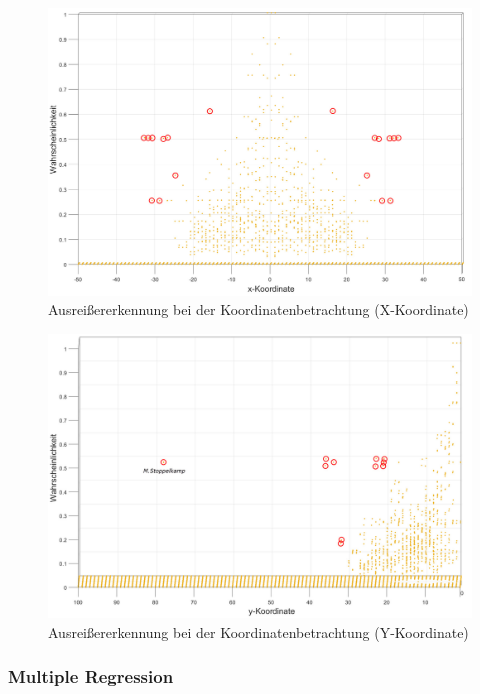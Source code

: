\begin{figure}[H]
\centering
\includegraphics[scale=0.31]{se-wa-jpg/outlierKY}
\caption{Ausreißererkennung bei der Koordinatenbetrachtung (X-Koordinate)}
\label{outlierKX}
\end{figure}

\begin{figure}[H]
\centering
\includegraphics[scale=0.31]{se-wa-jpg/outlierKX}
\caption{Ausreißererkennung bei der Koordinatenbetrachtung (Y-Koordinate)}
\label{outlierKY}
\end{figure}

\subsubsection{Multiple Regression}

